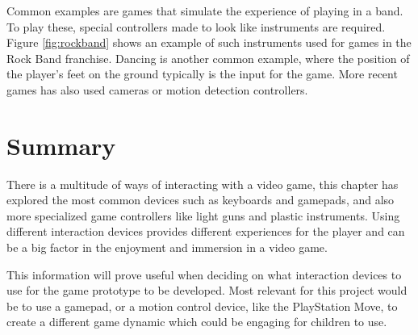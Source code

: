 Common examples are games that simulate the experience of playing in a band.
To play these, special controllers made to look like instruments are required.
Figure \ref{fig:rockband} shows an example of such instruments used for games in the Rock Band franchise.
Dancing is another common example, where the position of the player's feet on the ground typically is the input for the game.
More recent games has also used cameras or motion detection controllers.

\section{Summary}
There is a multitude of ways of interacting with a video game, this chapter has explored the most common devices such as keyboards and gamepads, and also more specialized game controllers like light guns and plastic instruments. Using different interaction devices provides different experiences for the player and can be a big factor in the enjoyment and immersion in a video game. 

This information will prove useful when deciding on what interaction devices to use for the game prototype to be developed. Most relevant for this project would be to use a gamepad, or a motion control device, like the PlayStation Move, to create a different game dynamic which could be engaging for children to use.
